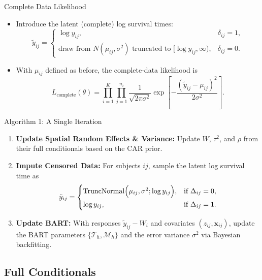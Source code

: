 \begin{frame}{Complete Data Likelihood}
  \begin{itemize}
    \item Introduce the latent (complete) log survival times:
      \[
      \tilde{y}_{ij} =
      \begin{cases}
        \log y_{ij}, & \delta_{ij}=1, \\[1ex]
        \text{draw from } N(\mu_{ij},\sigma^2) \text{ truncated to } [\log y_{ij},\infty), & \delta_{ij}=0.
      \end{cases}
      \]
    \item With \(\mu_{ij}\) defined as before, the complete-data likelihood is
      \[
      L_{\text{complete}}(\theta) = \prod_{i=1}^K \prod_{j=1}^{n_i} \frac{1}{\sqrt{2\pi\sigma^2}}
      \exp\!\left[-\frac{(\tilde{y}_{ij} - \mu_{ij})^2}{2\sigma^2}\right].
      \]
  \end{itemize}
\end{frame}


\begin{frame}{Algorithm 1: A Single Iteration}
  \begin{enumerate}
    \item \textbf{Update Spatial Random Effects \& Variance:} Update \(W\), \(\tau^2\), and \(\rho\) from their full conditionals based on the CAR prior.
    
    \item \textbf{Impute Censored Data:} For subjects $ij$, sample the latent log survival time as
      \[
      \tilde{y}_{ij} =
      \begin{cases}
        \operatorname{TruncNormal}\Bigl(\mu_{ij},\sigma^2;\log y_{ij}\Bigr), & \text{if } \Delta_{ij}=0, \\[1ex]
        \log y_{ij}, & \text{if } \Delta_{ij}=1.
      \end{cases}
      \]
    \item \textbf{Update BART:} With responses \(\tilde{y}_{ij} - W_i\) and covariates \((z_{ij},\mathbf{x}_{ij})\), update the BART parameters \(\{\mathcal{T}_h,\mathcal{M}_h\}\) and the error variance \(\sigma^2\) via Bayesian backfitting.
    
  \end{enumerate}
\end{frame}
 
\subsection{Full Conditionals}

